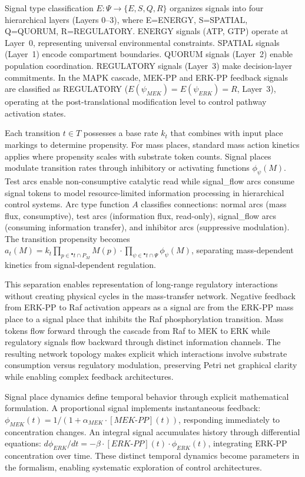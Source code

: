 \documentclass[twocolumn,11pt]{article}
\begin{document}
Signal type classification $E: \Psi \to \{E, S, Q, R\}$ organizes signals into four hierarchical layers (Layers 0--3), where E=ENERGY, S=SPATIAL, Q=QUORUM, R=REGULATORY. ENERGY signals (ATP, GTP) operate at Layer~0, representing universal environmental constraints. SPATIAL signals (Layer~1) encode compartment boundaries. QUORUM signals (Layer~2) enable population coordination. REGULATORY signals (Layer~3) make decision-layer commitments. In the MAPK cascade, MEK-PP and ERK-PP feedback signals are classified as REGULATORY ($E(\psi_{MEK}) = E(\psi_{ERK}) = R$, Layer~3), operating at the post-translational modification level to control pathway activation states.

Each transition $t \in T$ possesses a base rate $k_t$ that combines with input place markings to determine propensity. For mass places, standard mass action kinetics applies where propensity scales with substrate token counts. Signal places modulate transition rates through inhibitory or activating functions $\phi_\psi(M)$. Test arcs enable non-consumptive catalytic read while signal\_flow arcs consume signal tokens to model resource-limited information processing in hierarchical control systems. Arc type function $A$ classifies connections: normal arcs (mass flux, consumptive), test arcs (information flux, read-only), signal\_flow arcs (consuming information transfer), and inhibitor arcs (suppressive modulation). The transition propensity becomes $a_t(M) = k_t \prod_{p \in {}^{\bullet}t \cap P_M} M(p) \cdot \prod_{\psi \in {}^{\bullet}t \cap \Psi} \phi_\psi(M)$, separating mass-dependent kinetics from signal-dependent regulation.

This separation enables representation of long-range regulatory interactions without creating physical cycles in the mass-transfer network. Negative feedback from ERK-PP to Raf activation appears as a signal arc from the ERK-PP mass place to a signal place that inhibits the Raf phosphorylation transition. Mass tokens flow forward through the cascade from Raf to MEK to ERK while regulatory signals flow backward through distinct information channels. The resulting network topology makes explicit which interactions involve substrate consumption versus regulatory modulation, preserving Petri net graphical clarity while enabling complex feedback architectures.

Signal place dynamics define temporal behavior through explicit mathematical formulation. A proportional signal implements instantaneous feedback: $\phi_{MEK}(t) = 1/(1 + \alpha_{MEK} \cdot [MEK\text{-}PP](t))$, responding immediately to concentration changes. An integral signal accumulates history through differential equations: $d\phi_{ERK}/dt = -\beta \cdot [ERK\text{-}PP](t) \cdot \phi_{ERK}(t)$, integrating ERK-PP concentration over time. These distinct temporal dynamics become parameters in the formalism, enabling systematic exploration of control architectures.
\end{document}
